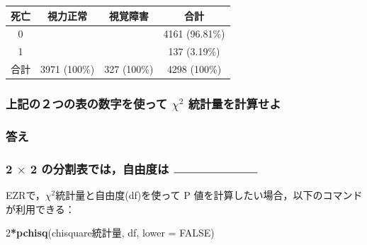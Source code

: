 \documentclass[11pt,]{problemset}
\newenvironment{Shaded}{\begin{snugshade}}{\end{snugshade}}
\newcommand{\KeywordTok}[1]{\textcolor[rgb]{0.13,0.29,0.53}{\textbf{#1}}}
\newcommand{\DataTypeTok}[1]{\textcolor[rgb]{0.13,0.29,0.53}{#1}}
\newcommand{\DecValTok}[1]{\textcolor[rgb]{0.00,0.00,0.81}{#1}}
\newcommand{\OtherTok}[1]{\textcolor[rgb]{0.56,0.35,0.01}{#1}}
\newcommand{\OperatorTok}[1]{\textcolor[rgb]{0.81,0.36,0.00}{\textbf{#1}}}
\newcommand{\NormalTok}[1]{#1}
\begin{document}
\begin{center}
\begin{tabular}{|c|c|c|c|}
\hline
死亡 & 視力正常                      & 視覚障害                   & 合計             \\ \hline
0  &                                 &                            &   4161 (96.81\%)        \\ \hline
1  &                                 &                            &  137 (3.19\%)    \\ \hline
合計 & 3971 (100\%)             & 327 (100\%)            & 4298 (100\%)   \\ \hline
\end{tabular}
\end{center}

\subsubsection{\texorpdfstring{上記の２つの表の数字を使って \(\chi^2\)
統計量を計算せよ}{上記の２つの表の数字を使って \textbackslash{}chi\^{}2 統計量を計算せよ}}\label{-chi2-}

\subsubsection{答え}\label{-6}

\bigskip\bigskip\bigskip\bigskip\bigskip\bigskip\bigskip
\bigskip\bigskip\bigskip\bigskip\bigskip\bigskip\bigskip

\subsubsection{\texorpdfstring{2 \(\times\) 2 の分割表では，自由度は
\(\rule{3cm}{0.2mm}\)}{2 \textbackslash{}times 2 の分割表では，自由度は \textbackslash{}rule\{3cm\}\{0.2mm\}}}\label{times-2--rule3cm0.2mm}

\newpage

\vfill

EZRで，\(\chi^2\)統計量と自由度(df)を使って P
値を計算したい場合，以下のコマンドが利用できる：

\begin{Shaded}
\begin{Highlighting}[]
\DecValTok{2}\OperatorTok{*}\KeywordTok{pchisq}\NormalTok{(chisquare統計量, df, }\DataTypeTok{lower =} \OtherTok{FALSE}\NormalTok{)}
\end{Highlighting}
\end{Shaded}
\end{document}
